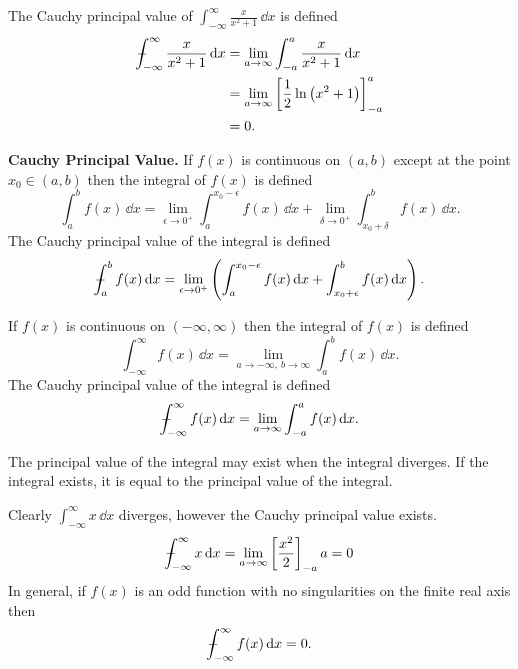 The Cauchy principal value of $\int_{-\infty}^\infty \frac{x}{x^2+1} \,\dd x$ is defined
\begin{align*}
  - \negthickspace \negthickspace \negthickspace \negmedspace \int_{-\infty}^\infty \frac{x}{x^2+1} \,\mathrm{d} x 
  &= \lim_{a \to \infty} \int_{-a}^a \frac{x}{x^2+1} \,\mathrm{d} x \\
  &= \lim_{a \to \infty} \left[ \frac{1}{2} \ln \left( x^2+1 \right) \right]_{-a}^a \\
  &= 0.
\end{align*}




\begin{Result}
  \textbf{Cauchy Principal Value.}
  If $f(x)$ is continuous on $(a,b)$ except at the point $x_0 \in (a,b)$ then 
  the integral of $f(x)$ is defined
  \[
  \int_a^b f(x) \,\dd x = \lim_{\epsilon \to 0^+} \int_a^{x_0-\epsilon} f(x) \,\dd x
  + \lim_{\delta \to 0^+} \int_{x_0+\delta}^b f(x) \,\dd x.
  \]
  The Cauchy principal value of the integral is defined
  \[
  - \negthickspace \negthickspace \negthickspace \negmedspace \int_a^b f(x) \,\mathrm{d} x = \lim_{\epsilon \to 0^+} \left(
    \int_a^{x_0-\epsilon} f(x) \,\mathrm{d} x
    + \int_{x_0+\epsilon}^b f(x) \,\mathrm{d} x \right).
  \]

  If $f(x)$ is continuous on $(-\infty,\infty)$ then the integral of $f(x)$ is defined
  \[
  \int_{-\infty}^\infty f(x) \,\dd x = \lim_{a \to -\infty,\ b \to \infty} \int_a^b f(x) \,\dd x.
  \]
  The Cauchy principal value of the integral is defined
  \[
  - \negthickspace \negthickspace \negthickspace \negmedspace \int_{-\infty}^\infty f(x) \,\mathrm{d} x = \lim_{a \to \infty} \int_{-a}^a f(x) \,\mathrm{d} x.
  \]

  The principal value of the integral may exist when the integral diverges.
  If the integral exists, it is equal to the principal value of the integral.
\end{Result}




\begin{Example}
  Clearly $\int_{-\infty}^\infty x \,\dd x$ diverges, however the Cauchy principal value exists.
  \[
  - \negthickspace \negthickspace \negthickspace \negmedspace \int_{-\infty}^\infty x \,\mathrm{d} x 
  = \lim_{a \to \infty} \left[ \frac{x^2}{2} \right]_{-a}{a} 
  = 0
  \]
  In general, if $f(x)$ is an odd function with no singularities on the finite 
  real axis then
  \[
  - \negthickspace \negthickspace \negthickspace \negmedspace \int_{-\infty}^\infty f(x) \,\mathrm{d} x = 0.
  \]
\end{Example}









